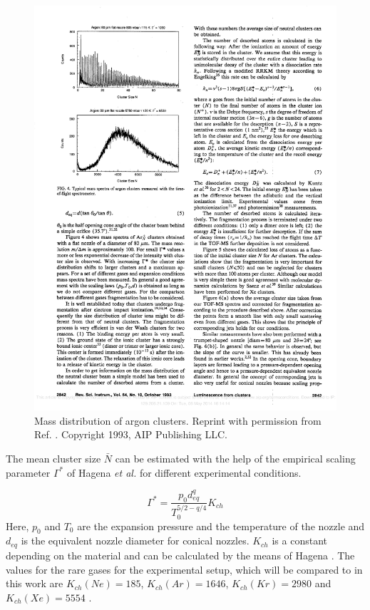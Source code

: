\begin{figure}[h]
  \includegraphics[scale=1.0]{pics/exp_clusters2.pdf}
  \caption{Mass distribution of argon clusters. Reprint with permission
           from Ref. \cite{Karnbach93}. Copyright 1993, AIP Publishing LLC.}
  \label{figure:cluster_mass}
\end{figure}

The mean cluster size $\bar{N}$ can be estimated with
the help of the empirical scaling parameter $\Gamma^*$ of Hagena \textit{et al.}
\cite{Hagena72,Hagena81} for different experimental conditions.

\begin{equation}
 \Gamma^* = \frac{p_0 d_{eq}^q}{T_0^{5/2-q/4}} K_{ch}
\end{equation}
Here, $p_0$ and $T_0$ are the expansion pressure and the temperature
of the nozzle and $d_{eq}$ is the equivalent nozzle diameter for conical
nozzles. $K_{ch}$ is a constant depending on the material and can be
calculated by the means of Hagena \cite{Hagena87}. The values for the rare gases for
the experimental setup, which will be compared to in this work are
$K_{ch}(Ne)=185$, $K_{ch}(Ar)=1646$, $K_{ch}(Kr)=2980$ and $K_{ch}(Xe)=5554$
\cite{PhDFoerstel}.

